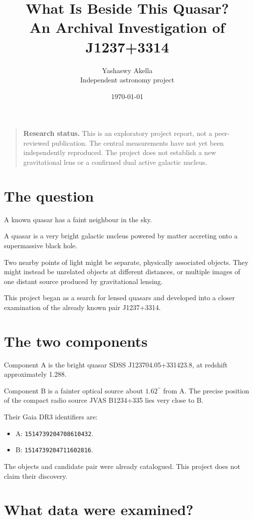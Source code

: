\documentclass[11pt,a4paper]{article}
\title{
    \textbf{What Is Beside This Quasar?}\\[0.4em]
    \large An Archival Investigation of J1237+3314
}
\author{
    Yashaswy Akella\\
    \small Independent astronomy project
}
\date{\today}
\newcommand{\arcsec}{\ensuremath{^{\prime\prime}}}
\begin{document}
\maketitle

\begin{quote}
\textbf{Research status.}
This is an exploratory project report, not a peer-reviewed
publication. The central measurements have not yet been
independently reproduced. The project does not establish a
new gravitational lens or a confirmed dual active galactic nucleus.
\end{quote}

\section{The question}

A known quasar has a faint neighbour in the sky.

A quasar is a very bright galactic nucleus powered by matter
accreting onto a supermassive black hole.

Two nearby points of light might be separate, physically
associated objects. They might instead be unrelated objects
at different distances, or multiple images of one distant
source produced by gravitational lensing.

This project began as a search for lensed quasars and developed
into a closer examination of the already known pair J1237+3314.

\section{The two components}

Component A is the bright quasar SDSS J123704.05+331423.8,
at redshift approximately 1.288.

Component B is a fainter optical source about \(1.62\arcsec\)
from A. The precise position of the compact radio source
JVAS B1234+335 lies very close to B.

Their Gaia DR3 identifiers are:
\begin{itemize}
    \item A: \texttt{1514739204708610432}.
    \item B: \texttt{1514739204711602816}.
\end{itemize}

The objects and candidate pair were already catalogued.
This project does not claim their discovery.

\section{What data were examined?}
\end{document}
